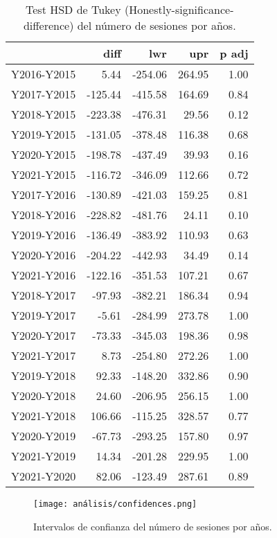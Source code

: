 \begin{table}[H]
\centering
\caption{Test HSD de Tukey (Honestly-significance-difference) del número de sesiones por años.}
\label{tab:Tukeynumsessions}
\begin{tabular}{rrrrr}
  \hline
 & diff & lwr & upr & p adj \\ 
  \hline
Y2016-Y2015 & 5.44 & -254.06 & 264.95 & 1.00 \\ 
  Y2017-Y2015 & -125.44 & -415.58 & 164.69 & 0.84 \\ 
  Y2018-Y2015 & -223.38 & -476.31 & 29.56 & 0.12 \\ 
  Y2019-Y2015 & -131.05 & -378.48 & 116.38 & 0.68 \\ 
  Y2020-Y2015 & -198.78 & -437.49 & 39.93 & 0.16 \\ 
  Y2021-Y2015 & -116.72 & -346.09 & 112.66 & 0.72 \\ 
  Y2017-Y2016 & -130.89 & -421.03 & 159.25 & 0.81 \\ 
  Y2018-Y2016 & -228.82 & -481.76 & 24.11 & 0.10 \\ 
  Y2019-Y2016 & -136.49 & -383.92 & 110.93 & 0.63 \\ 
  Y2020-Y2016 & -204.22 & -442.93 & 34.49 & 0.14 \\ 
  Y2021-Y2016 & -122.16 & -351.53 & 107.21 & 0.67 \\ 
  Y2018-Y2017 & -97.93 & -382.21 & 186.34 & 0.94 \\ 
  Y2019-Y2017 & -5.61 & -284.99 & 273.78 & 1.00 \\ 
  Y2020-Y2017 & -73.33 & -345.03 & 198.36 & 0.98 \\ 
  Y2021-Y2017 & 8.73 & -254.80 & 272.26 & 1.00 \\ 
  Y2019-Y2018 & 92.33 & -148.20 & 332.86 & 0.90 \\ 
  Y2020-Y2018 & 24.60 & -206.95 & 256.15 & 1.00 \\ 
  Y2021-Y2018 & 106.66 & -115.25 & 328.57 & 0.77 \\ 
  Y2020-Y2019 & -67.73 & -293.25 & 157.80 & 0.97 \\ 
  Y2021-Y2019 & 14.34 & -201.28 & 229.95 & 1.00 \\ 
  Y2021-Y2020 & 82.06 & -123.49 & 287.61 & 0.89 \\ 
   \hline
\end{tabular}
\end{table}

\begin{figure}[H]
    \centering
    \texttt{[image: análisis/confidences.png]}
    \caption{Intervalos de confianza del número de sesiones por años.}
    \label{fig:confidencenumsessions}
\end{figure}

